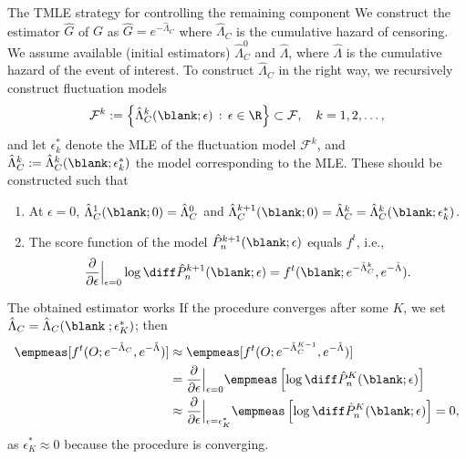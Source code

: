 \documentclass[handout]{beamer}\usepackage{listings}
\begin{document}
\begin{frame}[label={sec:org4b6f355}]{The TMLE strategy for controlling the remaining component}
We construct the estimator $\hat{G}$ of $G$ as $\hat{G} = e^{-\hat{\Lambda}_C}$ where
$\hat{\Lambda}_C$ is the cumulative hazard of censoring. \pause We assume available (initial
estimators) $\hat{\Lambda}_C^0$ and $\hat{\Lambda}$, where $\hat{\Lambda}$ is the cumulative
hazard of the event of interest. \pause To construct $\hat{\Lambda}_C$ in the right way, we
recursively construct fluctuation models
\begin{equation*}
  \mathcal{F}^{k}:=
  \left\{
    \hat{\Lambda}_C^{k}(\blank;\epsilon) \, : \, \epsilon \in \R
  \right\} \subset \mathcal{F}, \quad k = 1, 2, \dots, 
\end{equation*}
and let $\epsilon^*_k$ denote the MLE of the fluctuation model $\mathcal{F}^{k}$, and
$\hat{\Lambda}_C^k := \hat{\Lambda}_C^k(\blank; \epsilon^*_k)$ the model corresponding to the MLE. \pause
These should be constructed such that
\begin{enumerate}
\item \label{item:1} At $\epsilon = 0$, $\hat{\Lambda}_C^1(\blank; 0) = \hat{\Lambda}_C^0$ and
  $\hat{\Lambda}_C^{k+1}(\blank;0) = \hat{\Lambda}_C^{k} =
  \hat{\Lambda}_C^{k}(\blank;\epsilon^*_k)$. \pause
\item \label{item:2} The score function of the model
  $\hat{P}_n^{k+1}(\blank;\epsilon)$ equals $f^t$, i.e.,
  \begin{equation*}
    \frac{\partial }{\partial \epsilon} \Big\vert_{\epsilon=0} \log\diff\hat{P}_n^{k+1}(\blank;\epsilon) = f^t(\blank; e^{-\hat{\Lambda}_C^{k}}, e^{-\hat{\Lambda}}).
  \end{equation*}
\end{enumerate}
\end{frame}

\begin{frame}[label={sec:org9bddcde}]{The obtained estimator works}
If the procedure converges after some $K$, we set
$\hat{\Lambda}_C = \hat{\Lambda}_C(\blank \; ; \epsilon^*_K)$; then
\begin{align*}
  \empmeas[f^t(O; e^{-\hat{\Lambda}_C}, e^{-\hat{\Lambda}})]
  & \approx \empmeas[f^t(O; e^{-\hat{\Lambda}_C^{K-1}}, e^{-\hat{\Lambda}})]
  \\ &  = \frac{\partial }{\partial \epsilon} \Big\vert_{\epsilon=0}\empmeas
       \left[
       \log\diff\hat{P}_n^{K}(\blank;\epsilon)
       \right]
  \\ &
       \approx \frac{\partial }{\partial \epsilon} \Big\vert_{\epsilon=\epsilon^*_K}\empmeas
       \left[
       \log\diff\hat{P}_n^{K}(\blank;\epsilon)
       \right]
       = 0,
\end{align*}
as $\epsilon^*_K \approx 0$ because the procedure is converging. 
\end{frame}
\end{document}
